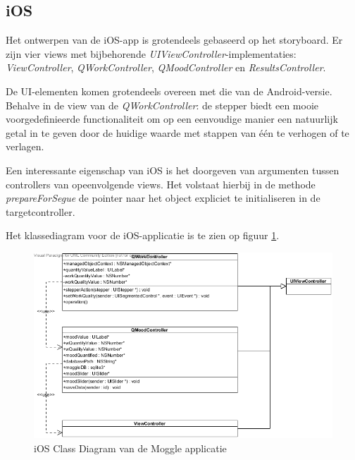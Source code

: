 \subsection{iOS}

Het ontwerpen van de iOS-app is grotendeels gebaseerd op het storyboard. Er zijn vier views met bijbehorende \textit{UIViewController}-implementaties: \textit{ViewController}, \textit{QWorkController}, \textit{QMoodController} en \textit{ResultsController}.

De UI-elementen komen grotendeels overeen met die van de Android-versie. Behalve in de view van de \textit{QWorkController}: de stepper biedt een mooie voorgedefinieerde functionaliteit om op een eenvoudige manier een natuurlijk getal in te geven door de huidige waarde met stappen van \'e\'en te verhogen of te verlagen.

Een interessante eigenschap van iOS is het doorgeven van argumenten tussen controllers van opeenvolgende views. Het volstaat hierbij in de methode \textit{prepareForSegue} de pointer naar het object expliciet te initialiseren in de targetcontroller.

Het klassediagram voor de iOS-applicatie is te zien op figuur \ref{fig:ios_classdiagram}. %

\begin{figure}
  \begin{center}
  \includegraphics[scale=0.7]{data/diagram-ios}
	\end{center}
  \caption{iOS Class Diagram van de Moggle applicatie}
  \label{fig:ios_classdiagram}
\end{figure}

